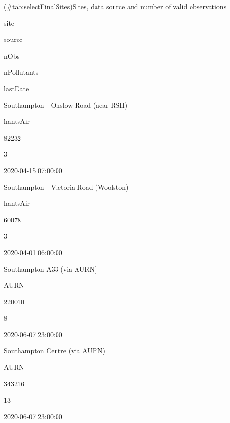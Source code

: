 \documentclass[]{article}
\newenvironment{Shaded}{\begin{snugshade}}{\end{snugshade}}
\newcommand{\KeywordTok}[1]{\textcolor[rgb]{0.13,0.29,0.53}{\textbf{#1}}}
\newcommand{\DataTypeTok}[1]{\textcolor[rgb]{0.13,0.29,0.53}{#1}}
\newcommand{\DecValTok}[1]{\textcolor[rgb]{0.00,0.00,0.81}{#1}}
\newcommand{\StringTok}[1]{\textcolor[rgb]{0.31,0.60,0.02}{#1}}
\newcommand{\OperatorTok}[1]{\textcolor[rgb]{0.81,0.36,0.00}{\textbf{#1}}}
\newcommand{\NormalTok}[1]{#1}
\begin{document}
\begin{Shaded}
\end{Shaded}

(\#tab:selectFinalSites)Sites, data source and number of valid
observations

site

source

nObs

nPollutants

lastDate

Southampton - Onslow Road (near RSH)

hantsAir

82232

3

2020-04-15 07:00:00

Southampton - Victoria Road (Woolston)

hantsAir

60078

3

2020-04-01 06:00:00

Southampton A33 (via AURN)

AURN

220010

8

2020-06-07 23:00:00

Southampton Centre (via AURN)

AURN

343216

13

2020-06-07 23:00:00
\end{document}
